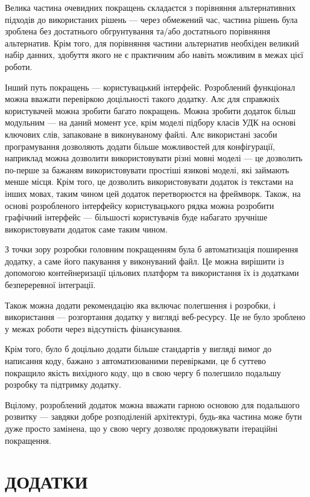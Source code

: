 \documentclass[14pt]{extarticle}
\let\oldsection\section
\renewcommand{\section}{\clearpage\oldsection}
\newcommand{\unnumberedSection}[1]{%
  \section*{#1}%
  \phantomsection
  \addcontentsline{toc}{section}{#1}%
}
\begin{document}
  Велика частина очевидних покращень складаєтся з порівняння альтернативних
  підходів до використаних рішень --- через обмежений час,
  частина рішень була зроблена без достатнього обгрунтування та/або
  достатнього порівняння альтернатив. Крім того,
  для порівняння частини альтернатив необхіден великий набір данних,
  здобуття якого не є практичним або навіть можливим в межах цієї роботи.

  Інший путь покращень --- користувацький інтерфейс.
  Розроблений функціонал можна вважати перевіркою доцільності такого додатку.
  Алє для справжніх користувачей можна зробити багато покращень.
  Можна зробити додаток більш модульним --- на даний момент усе,
  крім моделі підбору класів УДК на основі ключових слів,
  запаковане в виконуваному файлі.
  Алє використані засоби програмування дозволяють додати більше можливостей
  для конфігурації, наприклад можна дозволити використовувати різні мовні моделі
  --- це дозволить по-перше за бажаням використовувати простіші язикові моделі,
  які займають менше місця. Крім того,
  це дозволить використовувати додаток із текстами на інших мовах,
  таким чином цей додаток перетворюєтся на фреймворк.
  Також, на основі розробленого інтерфейсу користувацького рядка
  можна розробити графічний інтерфейс ---
  більшості користувачів буде набагато зручніше використовувати додаток
  саме таким чином.

  З точки зору розробки головним покращенням була б автоматизація
  поширення додатку, а саме його пакування у виконуваний файл.
  Це можна вирішити із допомогою контейнеризації цільових платформ
  та використання їх із додатками безпереревної інтеграції.

  Також можна додати рекомендацію яка включає полегшення і розробки,
  і використання --- розгортання додатку у вигляді веб-ресурсу.
  Це не було зроблено у межах роботи через відсутність фінансування.

  Крім того, було б доцільно додати більше стандартів у вигляді вимог
  до написання коду, бажано з автоматизованими перевірками, 
  це б суттево покращило якість вихідного коду,
  що в свою чергу б полегшило подальшу розробку та підтримку додатку.

  Вцілому, розроблений додаток можна вважати гарною
  основою для подальшого розвитку --- завдяки добре розподіленій архітектурі,
  будь-яка частина може бути дуже просто замінена,
  що у свою чергу дозволяє продовжувати ітераційні покращення.

  \printbibliography[heading=bibintoc, title=СПИСОК ВИКОРИСТАНОЇ ЛІТЕРАТУРИ]

  \unnumberedSection{ДОДАТКИ}
  
\end{document}
